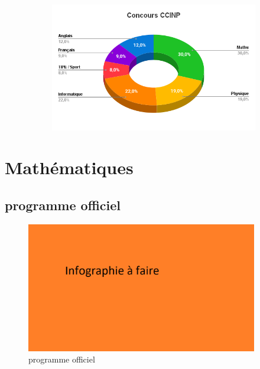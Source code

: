 \documentclass[aspectratio=169]{beamer}
\begin{document}
\begin{frame}
\begin{figure}[h]
\begin{subfigure}{0.49\textwidth}
        \end{subfigure}
        \begin{subfigure}{0.49\textwidth}
            \includegraphics[width=0.95\linewidth]{ressource_diapo/CCINP.png}
        \end{subfigure}
    \end{figure}
\end{frame}

\section{Mathématiques}

\subsection{programme officiel}

\begin{frame}
    \begin{figure}
        \centering
        \includegraphics[width=0.9\textwidth]{ressource_diapo/place older.png}
        \caption{programme officiel}
    \end{figure}
\end{frame}
\end{document}
